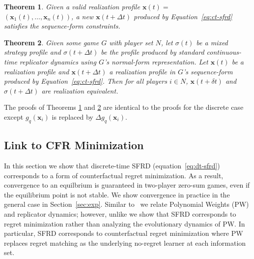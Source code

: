 \documentclass{aamas2014}
\newcommand{\bx}{\mathbf{x}}
\newtheorem{theorem}{Theorem}
\begin{document}
\begin{theorem}
\label{thm:ct-constraints}
Given a valid realization profile $\bx(t) = $\\ $(\bx_1(t), \ldots, \bx_n(t))$, a new $\bx(t + \Delta t)$ produced by
Equation~\ref{eq:ct-sfrd} satisfies the sequence-form constraints. 
\end{theorem}

\begin{theorem}
\label{thm:ct-releq}
Given some game $G$ with player set $N$, 
let $\sigma(t)$ be a mixed strategy profile and $\sigma(t + \Delta t)$ be the profile produced by 
standard continuous-time replicator dynamics using $G$'s normal-form representation. 
Let $\bx(t)$ be a realization profile and $\bx(t + \Delta t)$ a realization profile in $G$'s sequence-form produced by 
Equation~\ref{eq:ct-sfrd}. Then for all players $i \in N$, $\bx(t+\delta t)$ and $\sigma(t + \Delta t)$ are realization equivalent.
\end{theorem}

The proofs of Theorems \ref{thm:ct-constraints} and \ref{thm:ct-releq} are identical to the proofs for the discrete case 
except $g_q(\bx_i)$ is replaced by $\Delta g_q(\bx_i)$.

\subsection{Link to CFR Minimization}

In this section we show that discrete-time SFRD (equation~\ref{eq:dt-sfrd}) corresponds to a form of counterfactual 
regret minimization. As a result, convergence to an equilbrium is guaranteed in two-player zero-sum games, 
even if the equilibrium point is not stable. We show convergence in practice in the general case in 
Section~\ref{sec:exp}. 
Similar to~\cite{Klos10Evolutionary} we relate Polynomial Weights (PW) and replicator dynamics; 
however, unlike \cite{Klos10Evolutionary} we show that SFRD corresponds to regret minimization rather than analyzing the 
evolutionary dynamics of PW. In particular, SFRD corresponds to counterfactual regret minimization where PW replaces 
regret matching as the underlying no-regret learner at each information set. 
\end{document}
